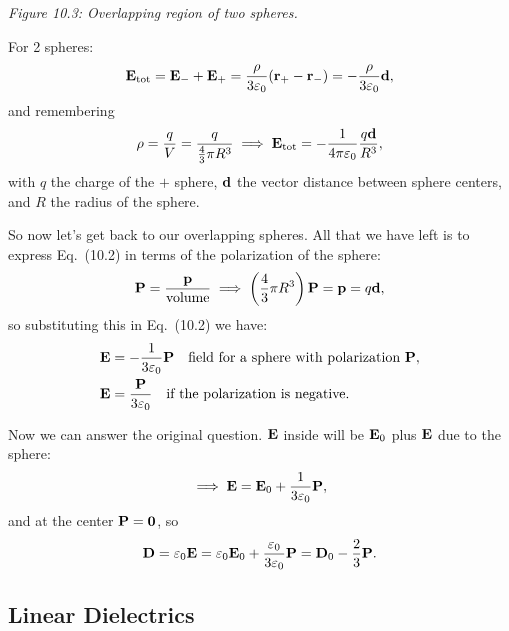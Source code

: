 \begin{example}
\begin{minipage}{0.38\textwidth}
\par\smallskip\small\textit{Figure 10.3: Overlapping region of two spheres.}
\end{minipage}
\hfill
\begin{minipage}{0.58\textwidth}
For 2 spheres:
\begin{equation}
    \vb{E}_{\text{tot}} = \vb{E}_- + \vb{E}_+ = \frac{\rho}{3\varepsilon_0}(\vb{r}_+ - \vb{r}_-) = -\frac{\rho}{3\varepsilon_0}\vb{d},
\end{equation}
and remembering
\[
\rho = \frac{q}{V} = \frac{q}{\frac{4}{3}\pi R^3} \implies \vb{E}_{\text{tot}} = -\frac{1}{4\pi\varepsilon_0}\frac{q\vb{d}}{R^3},
\]
with $q$ the charge of the $+$ sphere, $\vb{d}$ the vector distance between sphere centers, and $R$ the radius of the sphere.
\end{minipage}

\vspace{0.8em}
So now let's get back to our overlapping spheres. All that we have left is to express Eq.~(10.2) in terms of the polarization of the sphere:
\[
\vb{P} = \frac{\vb{p}}{\text{volume}} \implies \left(\frac{4}{3}\pi R^3\right)\vb{P} = \vb{p} = q\vb{d},
\]
so substituting this in Eq.~(10.2) we have:
\begin{align*}
    \vb{E} &= -\frac{1}{3\varepsilon_0}\vb{P} \quad \text{field for a sphere with polarization }\vb{P}, \\
    \vb{E} &= \frac{\vb{P}}{3\varepsilon_0} \quad \text{if the polarization is negative.}
\end{align*}

Now we can answer the original question. $\vb{E}$ inside will be $\vb{E}_0$ plus $\vb{E}$ due to the sphere:
\[
\implies \vb{E} = \vb{E}_0 + \frac{1}{3\varepsilon_0}\vb{P},
\]
and at the center $\vb{P} = \vb{0}$, so
\[
\vb{D} = \varepsilon_0 \vb{E} = \varepsilon_0 \vb{E}_0 + \frac{\varepsilon_0}{3\varepsilon_0}\vb{P} = \vb{D}_0 - \frac{2}{3}\vb{P}.
\]
\end{example}

\subsection{Linear Dielectrics}

